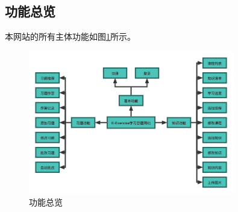 \documentclass{nwafucoursepaper}
\begin{document}
\newpage

\subsection{功能总览}

本网站的所有主体功能如图\ref{功能总览图}所示。

\begin{figure}[htp]
  \centering
  \includegraphics[width=0.8\textwidth]{功能总览图.png}
  \caption{功能总览}
  \label{功能总览图}
\end{figure}

\end{document}
